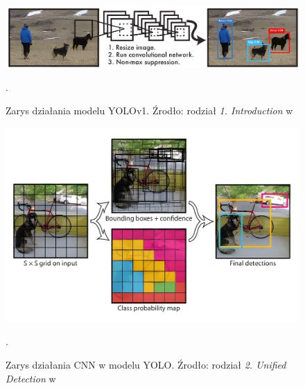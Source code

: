\begin{figure}[H]
    \centering
    \includegraphics[width=\linewidth]{r_technologie/AI_assets/yolov1_1.png}
    \caption{Zarys działania modelu YOLOv1. Źrodło: rodział \emph{1. Introduction} w \cite{yolo_pierwszy_artykul}} .
    \label{fig:yolov1-schemat-dzialania}
\end{figure}
\begin{figure}[H]
    \centering
    \includegraphics[width=\linewidth]{r_technologie/AI_assets/yolov1_2.jpg}
    \caption{Zarys działania CNN w modelu YOLO. Źrodło: rodział \emph{2. Unified Detection} w \cite{yolo_pierwszy_artykul}} .
    \label{fig:yolov1-schemat-dzialania-CNN}
\end{figure}


